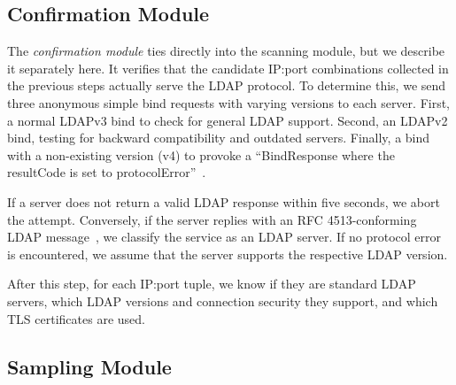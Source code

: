 


\subsection{Confirmation Module}
The \emph{confirmation module} ties directly into the scanning module, but we describe it separately here. It verifies that the candidate IP:port combinations collected in the previous steps actually serve the \gls{LDAP} protocol. To determine this, we send three anonymous simple bind requests with varying versions to each server. First, a normal LDAPv3 bind to check for general LDAP support. Second, an LDAPv2 bind, testing for backward compatibility and outdated servers. Finally, a bind with a non-existing version (v4) to provoke a ``BindResponse where the resultCode is set to protocolError''~\cite{rfc4511}.

If a server does not return a valid LDAP response within five seconds, we abort the attempt. Conversely, if the server replies with an RFC 4513-conforming LDAP message~\cite{rfc4513}, we classify the service as an LDAP server. If no protocol error is encountered, we assume that the server supports the respective LDAP version.

After this step, for each IP:port tuple, we know if they are standard \gls{LDAP} servers, which LDAP versions and connection security they support, and which TLS certificates are used.

\subsection{Sampling Module}
\label{subsec:samplingModule}

